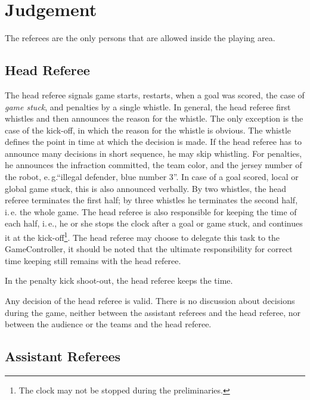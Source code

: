 \documentclass[12pt]{article}
\newcommand{\ie}{\mbox{i.\,e.}\xspace}
\newcommand{\eg}{\mbox{e.\,g.}\xspace}
\begin{document}
\section{Judgement}

The referees are the only persons that are allowed inside the playing area.

\subsection{Head Referee}

The head referee signals game starts, restarts, when a goal was scored, the case of \emph{game stuck}, and penalties by a single whistle. In general, the head referee first whistles and then announces the reason for the whistle. The only exception is the case of the kick-off, in which the reason for the whistle is obvious. The whistle defines the point in time at which the decision is made. If the head referee has to announce many decisions in short sequence, he may skip whistling. For penalties, he announces the infraction committed, the team color, and the jersey number of the robot, \eg ``illegal defender, blue number 3''. In case of a goal scored, local or global game stuck, this is also announced verbally. By two whistles, the head referee terminates the first half; by three whistles he terminates the second half, \ie the whole game. The head referee is also responsible for keeping the time of each half, \ie, he or she stops the clock after a goal or game stuck, and continues it at the kick-off\footnote{The clock may not be stopped during the preliminaries.}. The head referee may choose to delegate this task to the GameController, it should be noted that the ultimate responsibility for correct time keeping still remains with the head referee.

In the penalty kick shoot-out, the head referee keeps the time.

Any decision of the head referee is valid. There is no discussion about decisions during the game, neither between the assistant referees and the head referee, nor between the audience or the teams and the head referee.

\subsection{Assistant Referees}
\end{document}
